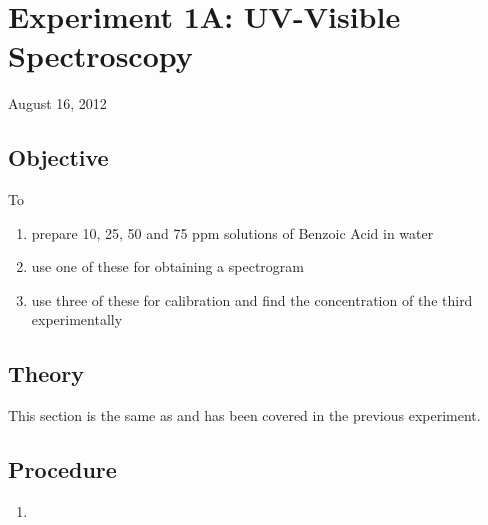 \chapter{Experiment 1A: UV-Visible Spectroscopy}
\begin{flushright}
August 16, 2012
\end{flushright}

\section{Objective}
	To
	\begin{enumerate}
		\item prepare 10, 25, 50 and 75 ppm solutions of Benzoic Acid in water
		\item use one of these for obtaining a spectrogram
		\item use three of these for calibration and find the concentration of the third experimentally
	\end{enumerate}

	\section{Theory}
	This section is the same as and has been covered in the previous experiment.

\section{Procedure}
	\begin{enumerate}
		\item 
	\end{enumerate}
